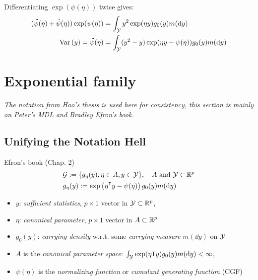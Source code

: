 Differentiating $\exp(\psi(\eta))$ twice gives:
\begin{align}
    (\ddot{\psi}(\eta) + \dot{\psi}(\eta)) \exp(\psi(\eta))
        &= \int_{\Yc} y^2 \exp(\eta y) g_0(y) m(\dd{y}) \\
    \VAR{y} = \ddot{\psi}(\eta) &= \int_{\Yc} (y^2 - y)\exp(\eta y - \psi(\eta)) g_0(y) m(\dd{y})
\end{align}

\section{Exponential family}

\textit{The notation from Hao's thesis is used here for consistency, 
this section is mainly on Peter's MDL and Bradley Efron's book.}

\subsection{Unifying the Notation Hell}

Efron's book (Chap. 2)
\begin{align}
    &\Gc := \{g_{\eta}(y), \eta \in A, y \in \Yc \}, \quad A \text{ and } \Yc \in \Rf^p \\
    &g_{\eta}(y) := \exp\left(\eta^\transpose y - \psi(\eta)\right) g_0(y) m(\dd{y})
\end{align}
\begin{itemize}
    \item $y$: \textit{sufficient statistics}, $p \times 1$ vector in $\mathcal{Y} \subset \mathbb{R}^p$,
    \item $\eta$: \textit{canonical parameter}, $p \times 1 $ vector in $A \subset \mathbb{R}^p$
    \item $g_0(y)$: \textit{carrying density} w.r.t. some \textit{carrying measure} $m(\dd{y})$ on $\mathcal{Y}$
    \item $A$ is the \textit{canonical parameter space}: $\int_{\Yc} \exp(\eta\transpose y) g_0(y)m(\dd{y}) <\infty$,
    \item $\psi(\eta)$ is the \textit{normalizing function} or \textit{cumulant generating function} (CGF)
\end{itemize}

